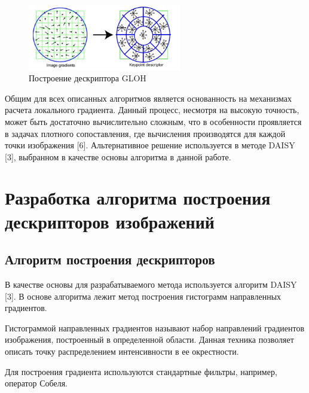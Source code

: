 {{{{	\begin{figure}[H]
		\centering                             
		\includegraphics[width=0.6\textwidth,keepaspectratio]{daisy/GLOH.jpg}       
		\centering\caption{ Построение дескриптора GLOH }
		\label{gradient_example}                           
	\end{figure} 

	Общим для всех описанных алгоритмов является основанность на механизмах расчета локального градиента. Данный процесс, несмотря на высокую точность, может быть достаточно вычислительно сложным, что в особенности проявляется в задачах плотного сопоставления, где вычисления производятся для каждой точки изображения [6]. Альтернативное решение используется в методе DAISY [3], выбранном в качестве основы алгоритма в данной работе. 
	
}

\newpage

\section{Разработка алгоритма построения дескрипторов изображений}
{
	\subsection{Алгоритм построения дескрипторов}
	{
		В качестве основы для разрабатываемого метода используется алгоритм DAISY [3].
		В основе алгоритма лежит метод построения гистограмм направленных градиентов. 
		
		Гистограммой направленных градиентов называют набор направлений градиентов изображения, построенный в определенной области. Данная техника позволяет описать точку распределением интенсивности в ее окрестности.
		
		Для построения градиента используются стандартные фильтры, например, оператор Собеля. 
		
}}}}}
